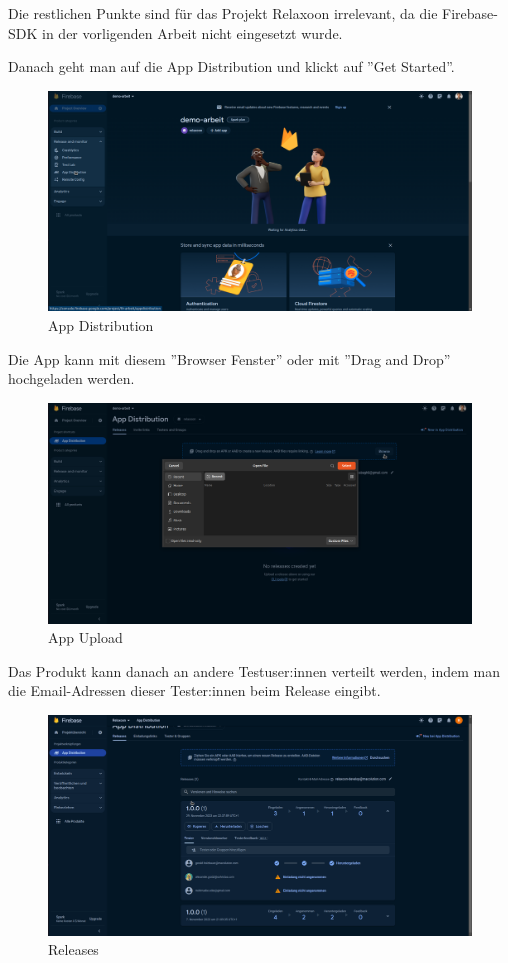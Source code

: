 Die restlichen Punkte sind für das Projekt Relaxoon irrelevant,
da die Firebase-SDK in der vorligenden Arbeit nicht eingesetzt wurde.


Danach geht man auf die App Distribution und klickt auf ''Get Started''.
\begin{figure}[H]
  \includegraphics[width=\textwidth]{./pics/firebase3.png}
  \caption{App Distribution}
\end{figure}

Die App kann mit diesem ''Browser Fenster'' oder mit ''Drag and Drop'' hochgeladen werden.
\begin{figure}[H]
  \includegraphics[width=\textwidth]{./pics/firebase4.png}
  \caption{App Upload}

\end{figure}


Das Produkt kann danach an andere Testuser:innen verteilt werden, indem man die Email-Adressen dieser
Tester:innen beim Release eingibt.
\begin{figure}[H]
  \includegraphics[width=\textwidth]{./pics/firebase5.png}
  \caption{Releases}


\end{figure}



